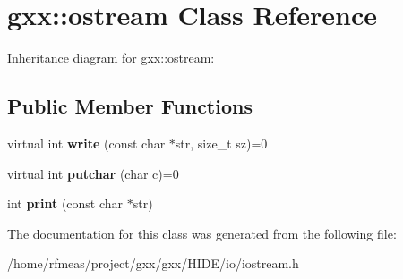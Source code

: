 \hypertarget{classgxx_1_1ostream}{}\section{gxx\+:\+:ostream Class Reference}
\label{classgxx_1_1ostream}


Inheritance diagram for gxx\+:\+:ostream\+:
\subsection*{Public Member Functions}
\begin{DoxyCompactItemize}
\item 
virtual int {\bfseries write} (const char $\ast$str, size\+\_\+t sz)=0\hypertarget{classgxx_1_1ostream_ac0dc6cbad9f4a4d1ad561ece405e6d55}{}\label{classgxx_1_1ostream_ac0dc6cbad9f4a4d1ad561ece405e6d55}

\item 
virtual int {\bfseries putchar} (char c)=0\hypertarget{classgxx_1_1ostream_a8380b8ab80ecafbef5bd62dc92d35b7c}{}\label{classgxx_1_1ostream_a8380b8ab80ecafbef5bd62dc92d35b7c}

\item 
int {\bfseries print} (const char $\ast$str)\hypertarget{classgxx_1_1ostream_a4ae694e633257eb7e3d097d2092e8129}{}\label{classgxx_1_1ostream_a4ae694e633257eb7e3d097d2092e8129}

\end{DoxyCompactItemize}


The documentation for this class was generated from the following file\+:\begin{DoxyCompactItemize}
\item 
/home/rfmeas/project/gxx/gxx/\+H\+I\+D\+E/io/iostream.\+h\end{DoxyCompactItemize}
